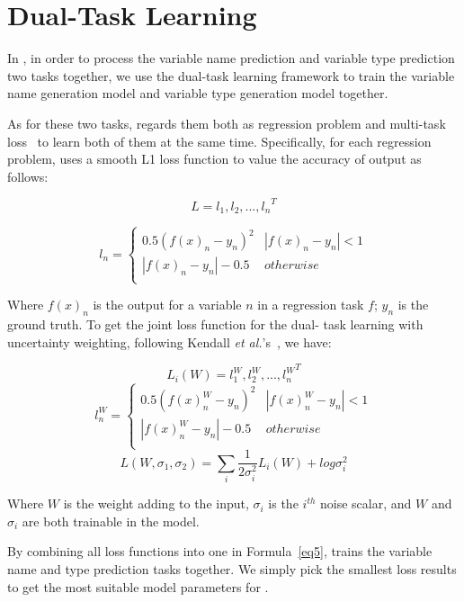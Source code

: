 \section{Dual-Task Learning}
\label{sec:dual}

In {\tool}, in order to process the variable name prediction and variable type prediction two tasks together, we use the dual-task learning framework to train the variable name generation model and variable type generation model together. 

As for these two tasks, {\tool} regards them both as regression problem and multi-task loss~\cite{kendall2018multi} to learn both of them at the same time. Specifically, for each regression problem, \tool uses a smooth L1 loss function to value the accuracy of output as follows:

\begin{equation}\label{eq1}
L = {l_1, l_2, ..., l_n}^T
\end{equation}

\begin{equation}\label{eq2}
l_n = \left\{ 
	\begin{array}{lr}
    	0.5(f(x)_n-y_n)^2  & |f(x)_n-y_n|<1 \\
   	    |f(x)_n-y_n|-0.5   & otherwise   \\
	\end{array}
\right.
\end{equation}

Where $f(x)_n$ is the output for a variable $n$ in a regression task $f$; $y_n$ is the ground truth. To get the joint loss function for the dual- task learning with uncertainty weighting, following Kendall {\em et al.}'s~\cite{kendall2018multi}, we have:

\begin{equation}\label{eq3}
L_i(W) = {l_1^W, l_2^W, ..., l_n^W}^T
\end{equation}
\begin{equation}\label{eq4}
l_n^W = \left\{ 
	\begin{array}{lr}
		0.5(f(x)^W_n-y_n)^2  & |f(x)^W_n-y_n|<1 \\
		|f(x)^W_n-y_n|-0.5   & otherwise   \\
	\end{array}
\right.
\end{equation}
\begin{equation}\label{eq5}
L(W, \sigma_1, \sigma_2) = \sum_i\frac{1}{2\sigma_i^2}L_i(W) + log \sigma^2_i
\end{equation}

Where $W$ is the weight adding to the input, $\sigma_i$ is the $i^{th}$ noise scalar, and $W$ and $\sigma_i$ are both trainable in the model.

By combining all loss functions into one in Formula~\ref{eq5}, {\tool} trains the variable name and type prediction tasks together. We simply pick the smallest loss results to get the most suitable model parameters for {\tool}.